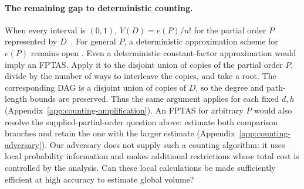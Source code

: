 \paragraph{The remaining gap to deterministic counting.}
When every interval is $(0,1)$, $V(D)=e(P)/n!$ for the partial order $P$
represented by $D$~\cite{stanley}. For general $P$, a deterministic
approximation scheme for $e(P)$ remains open
\cite[Sections~3.6 and~12.2]{chan-pak-survey}. Even a deterministic
constant-factor approximation would imply an FPTAS. Apply it to the
disjoint union of copies of the partial order $P$, divide by the number
of ways to interleave the copies, and take a root. The corresponding DAG
is a disjoint union of copies of $D$, so the degree and path-length bounds
are preserved. Thus the same argument applies for each fixed $d,h$
(Appendix~\ref{app:counting-amplification}).
An FPTAS for arbitrary $P$ would also resolve the supplied-partial-order
question above: estimate both comparison branches and retain the one
with the larger estimate (Appendix~\ref{app:counting-adversary}).
Our adversary does not supply such a counting algorithm: it uses local
probability information and makes additional restrictions whose total
cost is controlled by the analysis. Can these local calculations be
made sufficiently efficient at high accuracy to estimate global volume?

